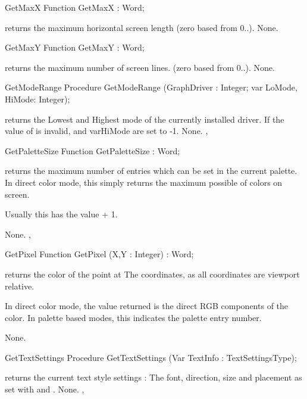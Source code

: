 \begin{function}{GetMaxX}
\Declaration
Function GetMaxX  : Word;

\Description
{} returns the maximum horizontal screen
length (zero based from 0..).
\Errors
None.
\SeeAlso
{}
\end{function}
\begin{function}{GetMaxY}
\Declaration
Function GetMaxY  : Word;

\Description
{} returns the maximum number of screen
lines. (zero based from 0..).
\Errors
None.
\SeeAlso
{}
\end{function}

\begin{procedure}{GetModeRange}
\Declaration
Procedure GetModeRange (GraphDriver : Integer; var LoMode, HiMode: Integer);

\Description
{} returns the Lowest and Highest mode of the currently
installed driver. If the value of  is invalid, 
and var{HiMode} are set to -1.
\Errors
None.
\SeeAlso
{}, 
\end{procedure}
\begin{function}{GetPaletteSize}
\Declaration
Function GetPaletteSize  : Word;

\Description
{} returns the maximum number of entries which
can be set in the current palette. In direct color mode, this simply
returns the maximum possible of colors on screen.

Usually this has the value  + 1.

\Errors
None.
\SeeAlso
{},
\end{function}
\begin{function}{GetPixel}
\Declaration
Function GetPixel (X,Y : Integer) : Word;

\Description
{} returns the color
of the point at  The coordinates, as all coordinates
are viewport relative.

In direct color mode, the value returned is the direct RGB components of
the color. In palette based modes, this indicates the palette entry number.

\Errors
None.
\SeeAlso

\end{function}
\begin{procedure}{GetTextSettings}
\Declaration
Procedure GetTextSettings (Var TextInfo : TextSettingsType);

\Description
{} returns the current text style settings : The font,
direction, size and placement as set with  and
.
\Errors
None.
\SeeAlso
{}, 

\end{procedure}
